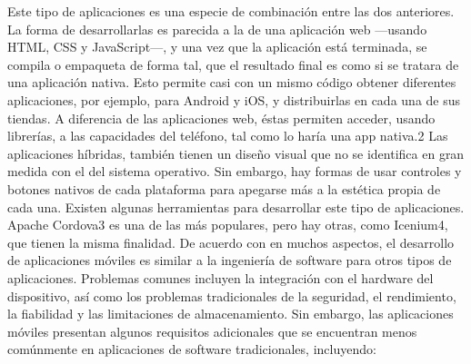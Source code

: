 Este tipo de aplicaciones es una especie de combinación entre las dos anteriores. La forma de desarrollarlas es parecida a la de una aplicación web ---usando HTML, CSS y JavaScript---, y una vez que la aplicación está terminada, se compila o empaqueta de forma tal, que el resultado final es como si se tratara de una aplicación nativa.
Esto permite casi con un mismo código obtener diferentes aplicaciones, por ejemplo, para Android y iOS, y distribuirlas en cada una de sus tiendas.
A diferencia de las aplicaciones web, éstas permiten acceder, usando librerías, a las capacidades del teléfono, tal como lo haría una app nativa.2
Las aplicaciones híbridas, también tienen un diseño visual que no se identifica en gran medida con el del sistema operativo. Sin embargo, hay formas de usar controles y botones nativos de cada plataforma para apegarse más a la estética propia de cada una.
Existen algunas herramientas para desarrollar este tipo de aplicaciones. Apache Cordova3 es una de las más populares, pero hay otras, como Icenium4, que tienen la misma finalidad.
De acuerdo con \citet{wasserman2010software} en muchos aspectos, el desarrollo de aplicaciones móviles es similar a la ingeniería de software para otros tipos de aplicaciones. Problemas comunes incluyen la integración con el hardware del dispositivo, así como los problemas tradicionales de la seguridad, el rendimiento, la fiabilidad y las limitaciones de almacenamiento. Sin embargo, las aplicaciones móviles presentan algunos requisitos adicionales que se encuentran menos comúnmente en aplicaciones de software tradicionales, incluyendo:
